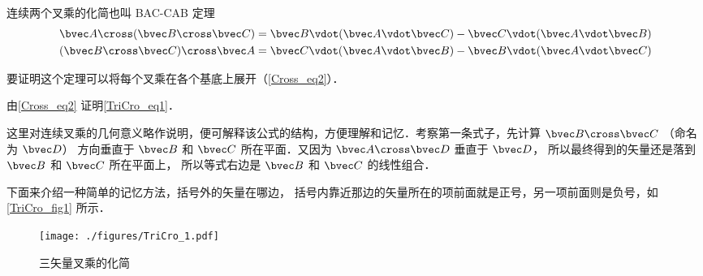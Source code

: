 

连续两个叉乘的化简也叫 BAC-CAB 定理
\begin{gather}
\bvec A \cross (\bvec B \cross \bvec C) = \bvec B \vdot (\bvec A \vdot \bvec C) - \bvec C \vdot (\bvec A \vdot \bvec B)\label{TriCro_eq1}\\
(\bvec B \cross \bvec C) \cross \bvec A = \bvec C \vdot (\bvec A \vdot \bvec B) - \bvec B \vdot (\bvec A \vdot \bvec C)
\end{gather}

要证明这个定理可以将每个叉乘在各个基底上展开（\autoref{Cross_eq2}）．

\begin{exercise}{}
由\autoref{Cross_eq2} 证明\autoref{TriCro_eq1}．
\end{exercise} 

这里对连续叉乘的几何意义略作说明，便可解释该公式的结构，方便理解和记忆．考察第一条式子，先计算 $\bvec B \cross \bvec C$ （命名为 $\bvec D$） 方向垂直于 $\bvec B$ 和 $\bvec C$ 所在平面．又因为 $\bvec A \cross \bvec D$ 垂直于 $\bvec D$， 所以最终得到的矢量还是落到 $\bvec B$ 和 $\bvec C$ 所在平面上， 所以等式右边是 $\bvec B$ 和 $\bvec C$ 的线性组合．

下面来介绍一种简单的记忆方法，括号外的矢量在哪边， 括号内靠近那边的矢量所在的项前面就是正号，另一项前面则是负号，如\autoref{TriCro_fig1} 所示．

\begin{figure}[ht]
\centering
\texttt{[image: ./figures/TriCro\_1.pdf]}
\caption{三矢量叉乘的化简}\label{TriCro_fig1}
\end{figure}